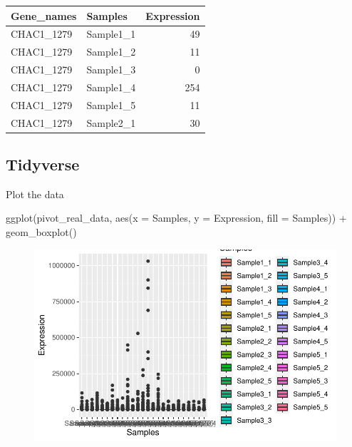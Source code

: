 \documentclass[
  letterpaper,
  DIV=11,
  numbers=noendperiod,
  landscape]{scrartcl}
\newenvironment{Shaded}{\begin{snugshade}}{\end{snugshade}}
\newcommand{\AttributeTok}[1]{\textcolor[rgb]{0.40,0.45,0.13}{#1}}
\newcommand{\FunctionTok}[1]{\textcolor[rgb]{0.28,0.35,0.67}{#1}}
\newcommand{\NormalTok}[1]{\textcolor[rgb]{0.00,0.23,0.31}{#1}}
\newcommand{\SpecialCharTok}[1]{\textcolor[rgb]{0.37,0.37,0.37}{#1}}
\begin{document}
\begin{table}
\centering
\begin{tabular}[t]{l|l|r}
\hline
Gene\_names & Samples & Expression\\
\hline
CHAC1\_1279 & Sample1\_1 & 49\\
\hline
CHAC1\_1279 & Sample1\_2 & 11\\
\hline
CHAC1\_1279 & Sample1\_3 & 0\\
\hline
CHAC1\_1279 & Sample1\_4 & 254\\
\hline
CHAC1\_1279 & Sample1\_5 & 11\\
\hline
CHAC1\_1279 & Sample2\_1 & 30\\
\hline
\end{tabular}
\end{table}

\hypertarget{tidyverse-6}{%
\subsection{Tidyverse}\label{tidyverse-6}}

Plot the data

\begin{Shaded}
\begin{Highlighting}[]
\FunctionTok{ggplot}\NormalTok{(pivot\_real\_data, }\FunctionTok{aes}\NormalTok{(}\AttributeTok{x =}\NormalTok{ Samples, }\AttributeTok{y =}\NormalTok{ Expression, }\AttributeTok{fill =}\NormalTok{ Samples)) }\SpecialCharTok{+}
  \FunctionTok{geom\_boxplot}\NormalTok{() }
\end{Highlighting}
\end{Shaded}

\begin{figure}[H]

{\centering \includegraphics{RandRStudio_files/figure-pdf/unnamed-chunk-25-1.pdf}

}

\end{figure}
\end{document}
